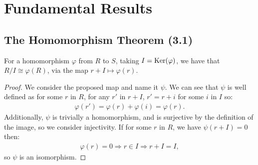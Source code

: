 \section{Fundamental Results}

\subsection{The Homomorphism Theorem (3.1)} \label{3.1}

For a homomorphism $\varphi$ from $R$ to $S$, taking $I = \operatorname{Ker}(\varphi)$, we have
that $R / I \cong \varphi(R)$, via the map $r + I \mapsto \varphi(r)$.

\begin{proof}
    We consider the proposed map and name it $\psi$.
    We can see that $\psi$ is well defined as for some $r$ in $R$, for any $r'$ in $r + I$, 
    $r' = r + i$ for some $i$ in $I$ so: \begin{align*}
        \varphi(r') = \varphi(r) + \varphi(i) = \varphi(r).
    \end{align*} Additionally, $\psi$ is trivially a homomorphism, and is surjective
    by the definition of the image, so we consider injectivity. 
    If for some $r$ in $R$, we have $\psi(r + I) = 0$ then: \begin{align*}
        \varphi(r) = 0 \Longrightarrow r \in I \Longrightarrow r + I = I,
    \end{align*} so $\psi$ is an isomorphism.
\end{proof}
